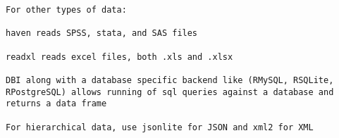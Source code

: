 \documentclass[]{article}
\begin{document}
\begin{verbatim}
For other types of data: 

haven reads SPSS, stata, and SAS files

readxl reads excel files, both .xls and .xlsx

DBI along with a database specific backend like (RMySQL, RSQLite, RPostgreSQL) allows running of sql queries against a database and returns a data frame

For hierarchical data, use jsonlite for JSON and xml2 for XML 
\end{verbatim}
\end{document}
